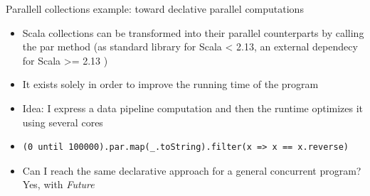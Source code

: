 \documentclass[presentation, 9pt]{beamer}\mode<presentation>{\usetheme{AMSBolognaFC}}
\begin{document}
\begin{frame}[fragile]{Parallell collections example: toward declative parallel computations}
	\begin{itemize}
		\item Scala collections can be transformed into their parallel counterparts by calling the par
		method (as standard library for Scala < 2.13, an external dependecy for Scala >= 2.13 \href{https://github.com/scala/scala-parallel-collections}{\faLink})
		\item It exists solely in order to improve the running time of the program
  	\item Idea: I express a data pipeline computation and then the runtime optimizes it using several cores
		\item[] \begin{tcolorbox}[left=0pt, top=0pt, bottom=0pt]
			\begin{verbatim}
(0 until 100000).par.map(_.toString).filter(x => x == x.reverse)
			\end{verbatim}
		\end{tcolorbox}
		\item Can I reach the same declarative approach for a general concurrent program? Yes, with \emph{Future} 
	\end{itemize}
\end{frame}
\end{document}
